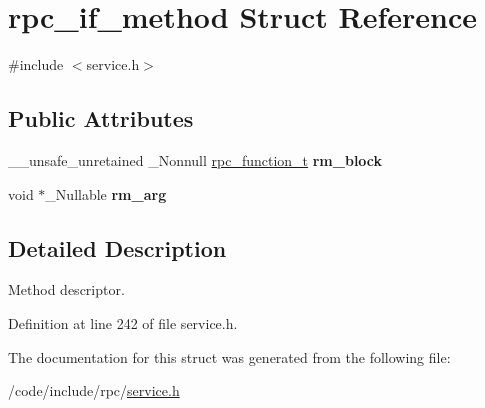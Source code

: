 \hypertarget{structrpc__if__method}{}\section{rpc\+\_\+if\+\_\+method Struct Reference}
\label{structrpc__if__method}


{\ttfamily \#include $<$service.\+h$>$}

\subsection*{Public Attributes}
\begin{DoxyCompactItemize}
\item 
\mbox{\label{structrpc__if__method_a479530c031d4da4fb1a3c6a38de19106}} 
\+\_\+\+\_\+unsafe\+\_\+unretained \+\_\+\+Nonnull \hyperlink{service_8h_ae49a22468cfcd4adfa558078e9e4e312}{rpc\+\_\+function\+\_\+t} {\bfseries rm\+\_\+block}
\item 
\mbox{\label{structrpc__if__method_a85a2f339a726ef4afb885cbf157c0998}} 
void $\ast$\+\_\+\+Nullable {\bfseries rm\+\_\+arg}
\end{DoxyCompactItemize}


\subsection{Detailed Description}
Method descriptor. 

Definition at line 242 of file service.\+h.



The documentation for this struct was generated from the following file\+:\begin{DoxyCompactItemize}
\item 
/code/include/rpc/\hyperlink{service_8h}{service.\+h}\end{DoxyCompactItemize}

